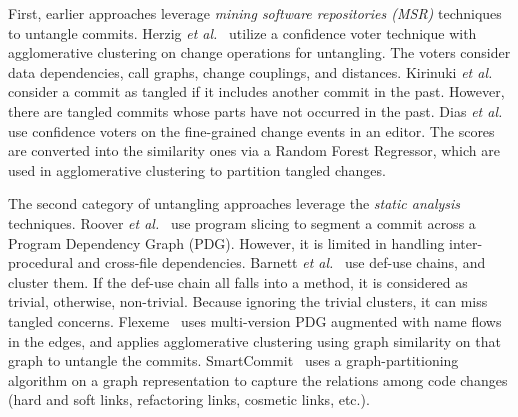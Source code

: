 First, earlier approaches leverage {\em mining software repositories
  (MSR)} techniques to untangle commits. Herzig {\em et
  al.}~\cite{kim-msr13,kim-emse16} utilize a confidence voter
technique with agglomerative clustering on change
operations for untangling.
The voters consider data dependencies, call graphs, change
couplings, and distances.
%
Kirinuki {\em et al.}~\cite{higo-apsec16, higo-icpc14} consider a
commit as tangled if it includes another commit in the past. However,
there are tangled commits whose parts have not occurred
in the past.
%
Dias {\em et al.}~\cite{dias-saner15} use confidence voters
on the fine-grained change events in an editor. The scores are converted
into the similarity ones via a Random Forest Regressor, which are used
in agglomerative clustering to partition tangled changes.

The second category of untangling approaches leverage the {\em static
analysis} techniques. Roover {\em et
  al.}~\cite{roover-scam18} use program slicing to segment a commit
across a Program Dependency Graph (PDG).  However, it is limited in
handling inter-procedural and cross-file dependencies. Barnett {\em et
  al.}~\cite{barnett-icse15} use def-use chains, and cluster them. If
the def-use chain all falls into a method, it is considered as
trivial, otherwise, non-trivial. Because ignoring the trivial
clusters, it can miss tangled concerns. Flexeme~\cite{flexeme-fse20}
uses multi-version PDG augmented with name flows in the edges, and
applies agglomerative clustering using graph similarity on that graph
to untangle the commits. SmartCommit~\cite{smartcommit-fse21} uses a
graph-partitioning algorithm on a graph representation to capture the
relations among code changes (hard and soft links, refactoring links,
cosmetic links, etc.).



